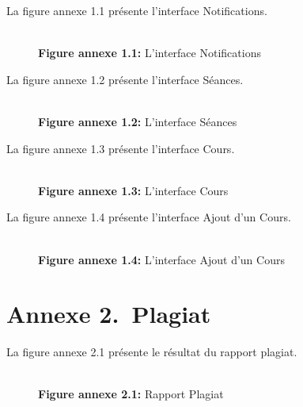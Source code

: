 
La figure annexe 1.1 présente l'interface Notifications.
\begin{figure}[H]
    \centering
    {\\\textbf{Figure annexe 1.1:} L'interface Notifications}
\end{figure}


La figure annexe 1.2 présente l'interface Séances.
\begin{figure}[H]
    \centering
    {\\\textbf{Figure annexe 1.2:} L'interface Séances}
\end{figure}




La figure annexe 1.3 présente l'interface Cours.
\begin{figure}[H]
    \centering
    {\\\textbf{Figure annexe 1.3:} L'interface Cours}
\end{figure}


La figure annexe 1.4 présente l'interface Ajout d'un Cours.
\begin{figure}[H]
    \centering
    {\\\textbf{Figure annexe 1.4:} L'interface Ajout d'un Cours}
\end{figure}
\newpage
\section*{Annexe 2.~Plagiat}

La figure annexe 2.1 présente le résultat du rapport plagiat.
\begin{figure}[H]
    \centering
    {\\\textbf{Figure annexe 2.1:} Rapport Plagiat}
\end{figure}
